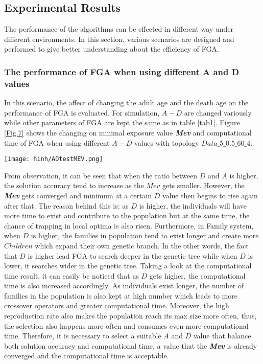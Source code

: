 \documentclass[final]{elsarticle}
\begin{document}
\subsection{Experimental Results}
The performance of the algorithms can be effected in different way under different environments. In this section, various scenarios are designed and performed to give better understanding about the efficiency of FGA.
\subsubsection{The performance of FGA when using different A and D values}
In this scenario, the affect of changing the adult age and the death age on the performance of FGA is evaluated. For simulation, $A - D$ are changed variously while other parameters of FGA are kept the same as in table \ref{tab1}. Figure \ref{Fig.7} shows the changing on minimal exposure value \textit{\textbf{Mev}} and computational time of FGA when using different $A-D$ values with topology $Data\_5\_0.5\_60\_4$.
\begin{figure*}[h]
	\texttt{[image: hinh/ADtestMEV.png]}
	\centering
	\caption{The Minimal Exposure Value when using different A-D values
	}
	\label{Fig.7}       %
\end{figure*}

From observation, it can be seen that when the ratio between $D$ and $A$ is higher, the solution accuracy tend to increase as the $Mev$ gets smaller. However, the \textit{\textbf{Mev}} gets converged and minimum at a certain $D$ value then begins to rise again after that. The reason behind this is: as $D$ is higher, the individuals will have more time to exist and contribute to the population but at the same time, the chance of trapping in local optima is also risen. Furthermore, in Family system, when $D$ is higher, the families in population tend to exist longer and create more $Children $ which expand their own genetic branch. In the other words, the fact that $D$ is higher lead FGA to search deeper in the genetic tree while when $D$ is lower, it searches wider in the genetic tree. Taking a look at the computational time result, it can easily be noticed that as $D$ gets higher, the computational time is also increased accordingly. As individuals exist longer, the number of families in the population is also kept at high number which leads to more crossover operators and greater computational time. Moreover, the high reproduction rate also makes the population reach its max size more often, thus, the selection also happens more often and consumes even more computational time. Therefore, it is necessary to select a suitable $A$ and $D$ value that balance both solution accuracy and computational time, a value that the \textbf{\textit{Mev}} is already converged and the computational time is acceptable.  
\end{document}
